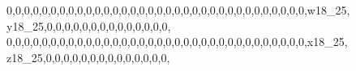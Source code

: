 \documentclass[]{article}
\newenvironment{Shaded}{\begin{snugshade}}{\end{snugshade}}
\newcommand{\DecValTok}[1]{\textcolor[rgb]{0.00,0.00,0.81}{#1}}
\newcommand{\NormalTok}[1]{#1}
\begin{document}
\begin{Shaded}
\begin{Highlighting}[]
\DecValTok{0}\NormalTok{,}\DecValTok{0}\NormalTok{,}\DecValTok{0}\NormalTok{,}\DecValTok{0}\NormalTok{,}\DecValTok{0}\NormalTok{,}\DecValTok{0}\NormalTok{,}\DecValTok{0}\NormalTok{,}\DecValTok{0}\NormalTok{,}\DecValTok{0}\NormalTok{,}\DecValTok{0}\NormalTok{,}\DecValTok{0}\NormalTok{,}\DecValTok{0}\NormalTok{,}\DecValTok{0}\NormalTok{,}\DecValTok{0}\NormalTok{,}\DecValTok{0}\NormalTok{,}\DecValTok{0}\NormalTok{,}\DecValTok{0}\NormalTok{,}\DecValTok{0}\NormalTok{,}\DecValTok{0}\NormalTok{,}\DecValTok{0}\NormalTok{,}\DecValTok{0}\NormalTok{,}\DecValTok{0}\NormalTok{,}\DecValTok{0}\NormalTok{,}\DecValTok{0}\NormalTok{,}\DecValTok{0}\NormalTok{,}\DecValTok{0}\NormalTok{,}\DecValTok{0}\NormalTok{,}\DecValTok{0}\NormalTok{,}\DecValTok{0}\NormalTok{,}\DecValTok{0}\NormalTok{,}\DecValTok{0}\NormalTok{,}\DecValTok{0}\NormalTok{,}\DecValTok{0}\NormalTok{,}\DecValTok{0}\NormalTok{,w18_}\DecValTok{25}\NormalTok{, y18_}\DecValTok{25}\NormalTok{,}\DecValTok{0}\NormalTok{,}\DecValTok{0}\NormalTok{,}\DecValTok{0}\NormalTok{,}\DecValTok{0}\NormalTok{,}\DecValTok{0}\NormalTok{,}\DecValTok{0}\NormalTok{,}\DecValTok{0}\NormalTok{,}\DecValTok{0}\NormalTok{,}\DecValTok{0}\NormalTok{,}\DecValTok{0}\NormalTok{,}\DecValTok{0}\NormalTok{,}\DecValTok{0}\NormalTok{,}\DecValTok{0}\NormalTok{,}\DecValTok{0}\NormalTok{,}
\DecValTok{0}\NormalTok{,}\DecValTok{0}\NormalTok{,}\DecValTok{0}\NormalTok{,}\DecValTok{0}\NormalTok{,}\DecValTok{0}\NormalTok{,}\DecValTok{0}\NormalTok{,}\DecValTok{0}\NormalTok{,}\DecValTok{0}\NormalTok{,}\DecValTok{0}\NormalTok{,}\DecValTok{0}\NormalTok{,}\DecValTok{0}\NormalTok{,}\DecValTok{0}\NormalTok{,}\DecValTok{0}\NormalTok{,}\DecValTok{0}\NormalTok{,}\DecValTok{0}\NormalTok{,}\DecValTok{0}\NormalTok{,}\DecValTok{0}\NormalTok{,}\DecValTok{0}\NormalTok{,}\DecValTok{0}\NormalTok{,}\DecValTok{0}\NormalTok{,}\DecValTok{0}\NormalTok{,}\DecValTok{0}\NormalTok{,}\DecValTok{0}\NormalTok{,}\DecValTok{0}\NormalTok{,}\DecValTok{0}\NormalTok{,}\DecValTok{0}\NormalTok{,}\DecValTok{0}\NormalTok{,}\DecValTok{0}\NormalTok{,}\DecValTok{0}\NormalTok{,}\DecValTok{0}\NormalTok{,}\DecValTok{0}\NormalTok{,}\DecValTok{0}\NormalTok{,}\DecValTok{0}\NormalTok{,}\DecValTok{0}\NormalTok{,x18_}\DecValTok{25}\NormalTok{, z18_}\DecValTok{25}\NormalTok{,}\DecValTok{0}\NormalTok{,}\DecValTok{0}\NormalTok{,}\DecValTok{0}\NormalTok{,}\DecValTok{0}\NormalTok{,}\DecValTok{0}\NormalTok{,}\DecValTok{0}\NormalTok{,}\DecValTok{0}\NormalTok{,}\DecValTok{0}\NormalTok{,}\DecValTok{0}\NormalTok{,}\DecValTok{0}\NormalTok{,}\DecValTok{0}\NormalTok{,}\DecValTok{0}\NormalTok{,}\DecValTok{0}\NormalTok{,}\DecValTok{0}\NormalTok{,}

\end{Highlighting}
\end{Shaded}
\end{document}
